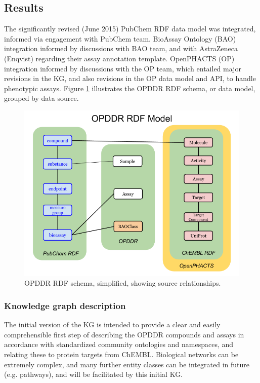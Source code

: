 \subsection{Results}

The significantly revised (June 2015) PubChem RDF data model was integrated, informed via engagement with PubChem team\cite{Kim2016-cl}. BioAssay Ontology (BAO) integration informed by discussions with BAO team\cite{Vempati2012-ns}, and with AstraZeneca (Enqvist) regarding their assay annotation template. OpenPHACTS (OP) integration informed by discussions with the OP team\cite{Williams2012-wx,Digles2018-qs}, which entailed major revisions in the KG, and also revisions in the OP data model and API, to handle phenotypic assays. Figure \ref{fig:opddr_01} illustrates the OPDDR RDF schema, or data model, grouped by data source.

\begin{figure}
    \centering
    \includegraphics[width=\linewidth]{figures/opddr/OPDDR_schema.png}
    \caption{OPDDR RDF schema, simplified, showing source relationships.}
    \label{fig:opddr_01}
\end{figure}

\subsubsection{Knowledge graph description}

The initial version of the KG is intended to provide a clear and easily comprehensible first step of describing the OPDDR compounds and assays in accordance with standardized community ontologies and namespaces, and relating these to protein targets from ChEMBL.  Biological networks can be extremely complex, and many further entity classes can be integrated in future (e.g. pathways), and will be facilitated by this initial KG.

